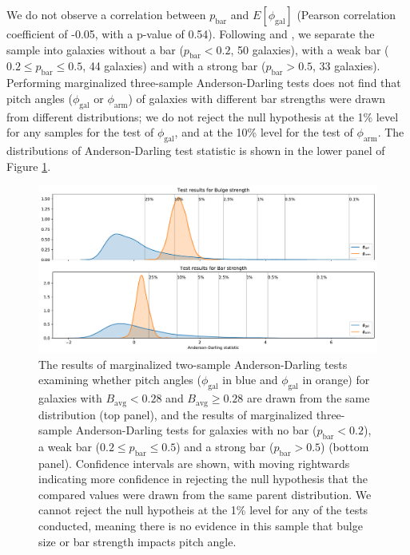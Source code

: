 We do not observe a correlation between $p_\mathrm{bar}$ and $E[\phi_\mathrm{gal}]$ (Pearson correlation coefficient of -0.05, with a p-value of 0.54). Following \citet{2012MNRAS.424.2180M} and \citet{2012MNRAS.423.1485S}, we separate the sample into galaxies without a bar ($p_\mathrm{bar} < 0.2$, 50 galaxies), with a weak bar ($0.2 \le p_\mathrm{bar} \le 0.5$, 44 galaxies) and with a strong bar ($p_\mathrm{bar} > 0.5$, 33 galaxies). Performing marginalized three-sample Anderson-Darling tests does not find that pitch angles ($\phi_\mathrm{gal}$ or $\phi_\mathrm{arm}$) of galaxies with different bar strengths were drawn from different distributions; we do not reject the null hypothesis at the 1\% level for any samples for the test of $\phi_\mathrm{gal}$, and at the 10\% level for the test of $\phi_\mathrm{arm}$. The distributions of Anderson-Darling test statistic is shown in the lower panel of Figure \ref{fig:ad-morphology-test}.

\begin{figure}
  \includegraphics[width=17.7cm]{plots/bulge_bar_test_results.pdf}
  \caption{The results of marginalized two-sample Anderson-Darling tests examining whether pitch angles ($\phi_\mathrm{gal}$ in blue and $\phi_\mathrm{gal}$ in orange) for galaxies with $B_\mathrm{avg} < 0.28$ and $B_\mathrm{avg} \ge 0.28$ are drawn from the same distribution (top panel), and the results of marginalized three-sample Anderson-Darling tests for galaxies with no bar ($p_\mathrm{bar} < 0.2$), a weak bar ($0.2 \le p_\mathrm{bar} \le 0.5$) and a strong bar ($p_\mathrm{bar} > 0.5$) (bottom panel). Confidence intervals are shown, with moving rightwards indicating more confidence in rejecting the null hypothesis that the compared values were drawn from the same parent distribution. We cannot reject the null hypotheis at the 1\% level for any of the tests conducted, meaning there is no evidence in this sample that bulge size or bar strength impacts pitch angle.}
  \label{fig:ad-morphology-test}
\end{figure}


